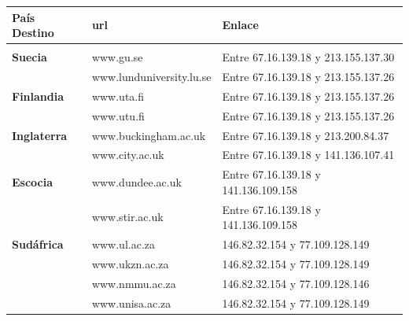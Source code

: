 \begin{tabular}{l l l}
  \textbf{País Destino} & \textbf{url} & \textbf{Enlace} \\
  \hline \\
 \textbf{Suecia} & www.gu.se & Entre 67.16.139.18 y 213.155.137.30\\
  & www.lunduniversity.lu.se & Entre 67.16.139.18 y 213.155.137.26\\
  \textbf{Finlandia} & www.uta.fi & Entre 67.16.139.18 y 213.155.137.26\\
    & www.utu.fi & Entre 67.16.139.18 y 213.155.137.26\\
   \textbf{Inglaterra} & www.buckingham.ac.uk & Entre 67.16.139.18 y 213.200.84.37\\
    & www.city.ac.uk & Entre 67.16.139.18 y 141.136.107.41\\
    \textbf{Escocia} & www.dundee.ac.uk & Entre 67.16.139.18 y 141.136.109.158\\
     & www.stir.ac.uk & Entre 67.16.139.18 y 141.136.109.158\\
     \textbf{Sudáfrica} & www.ul.ac.za & 146.82.32.154 y 77.109.128.149\\
      & www.ukzn.ac.za & 146.82.32.154 y 77.109.128.149\\
       & www.nmmu.ac.za & 146.82.32.154 y 77.109.128.146\\
        & www.unisa.ac.za & 146.82.32.154 y 77.109.128.149
 \end{tabular}

